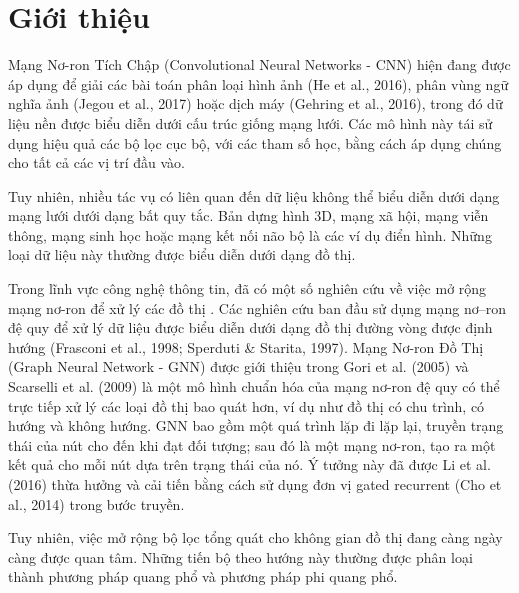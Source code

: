 \chapter{Giới thiệu}
\label{chap:Giới thiệu}


Mạng Nơ-ron Tích Chập (Convolutional Neural Networks - CNN) hiện đang được áp dụng để giải các bài toán phân loại hình ảnh (He et al., 2016), phân vùng ngữ nghĩa ảnh (Jegou et al., 2017) hoặc dịch máy (Gehring et al., 2016), trong đó dữ liệu nền được biểu diễn dưới cấu trúc giống mạng lưới. Các mô hình này tái sử dụng hiệu quả các bộ lọc cục bộ, với các tham số học, bằng cách áp dụng chúng cho tất cả các vị trí đầu vào.

Tuy nhiên, nhiều tác vụ có liên quan đến dữ liệu không thể biểu diễn dưới dạng mạng lưới dưới dạng bất quy tắc. Bản dựng hình 3D, mạng xã hội, mạng viễn thông, mạng sinh học hoặc mạng kết nối não bộ là các ví dụ điển hình. Những loại dữ liệu này thường được biểu diễn dưới dạng đồ thị.

Trong lĩnh vực công nghệ thông tin, đã có một số nghiên cứu về việc mở rộng mạng nơ-ron để xử lý các đồ thị . Các nghiên cứu ban đầu sử dụng mạng nơ–ron đệ quy để xử lý dữ liệu được biểu diễn dưới dạng đồ thị đường vòng được định hướng (Frasconi et al., 1998; Sperduti \& Starita, 1997). Mạng Nơ-ron Đồ Thị (Graph Neural Network - GNN) được giới thiệu trong Gori et al. (2005) và Scarselli et al. (2009) là một mô hình chuẩn hóa của mạng nơ-ron đệ quy có thể trực tiếp xử lý các loại đồ thị bao quát hơn, ví dụ như đồ thị có chu trình, có hướng và không hướng. GNN bao gồm một quá trình lặp đi lặp lại, truyền trạng thái của nút cho đến khi đạt đối tượng; sau đó là một mạng nơ-ron, tạo ra một kết quả cho mỗi nút dựa trên trạng thái của nó. Ý tưởng này đã được Li et al. (2016) thừa hưởng và cải tiến bằng cách sử dụng đơn vị gated recurrent (Cho et al., 2014) trong bước truyền.

Tuy nhiên, việc mở rộng bộ lọc tổng quát cho không gian đồ thị đang càng ngày càng được quan tâm. Những tiến bộ theo hướng này thường được phân loại thành phương pháp quang phổ và phương pháp phi quang phổ. 

